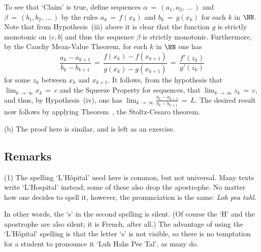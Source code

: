 \noindent To see that `Claim' is true, define sequences ${\alpha} \,=\, (a_{1}, a_{2},\,{\ldots}\,)$ and ${\beta} \,=\, (b_{1},b_{2},\,{\ldots}\,)$ by the rules $a_{k} \,=\, f(x_{k})$ and $b_{k} \,=\, g(x_{k})$ for each $k$ in ${\NN}$.
    Note that from Hypothesis~(iii) above it is clear that the function $g$ is strictly monotonic on $(c,b]$ and thus the sequence ${\beta}$ is strictly monotonic.
    Furthermore, by the Cauchy Mean-Value Theorem, for each $k$ in ${\NN}$ one has
        \begin{displaymath}
        \frac{a_{k} - a_{k+1}}{b_{k}- b_{k+1}} \,=\, \frac{f(x_{k}) - f(x_{k+1})}{g(x_{k}) - g(x_{k+1})} \,=\, \frac{f'(z_{k})}{g'(z_{k})}
        \end{displaymath}
    for some $z_{k}$ between $x_{k}$ and $x_{k+1}$.
    It follows, from the hypothesis that $\lim_{k \,{\rightarrow}\, {\infty}} x_{k} \,=\, c$ and the Squeeze Property for sequences,
that ${\displaystyle \lim_{k \,{\rightarrow}\, {\infty}} z_{k} \,=\, c}$, and thus, by Hypothesis~(iv), one has ${\displaystyle \lim_{k \,{\rightarrow}\, {\infty}} \frac{a_{k} - a_{k+1}}{b_{k} - b_{k+1}} \,=\, L}$.
    The desired result now follows by applying Theorem~, the Stoltz-Cesaro theorem.

\V

        (b) The proof here is similar, and is left as an exercise. \Q

\V
\V

             \subsection{\small{\bf Remarks}}
            \label{RemrkE50.70}

\V

\hspace*{\parindent}(1) The spelling `L'H\^{o}pital' used here is common, but not universal.
    Many texts write `L'Hospital' instead; some of these also drop the apostrophe.
    No matter how one decides to spell it, however, the pronunciation is the same: {\em Loh pea tahl}.

\noindent In other words, the `s' in the second spelling is silent. (Of course the `H' and the apostrophe are also silent; it is French, after all.)
    The advantage of using the `L'H\^{o}pital' spelling is that the letter `s' is not visible,
    so there is no temptation for a student to pronounce it `Luh Hahs Pee Tal', as many do.

\V

